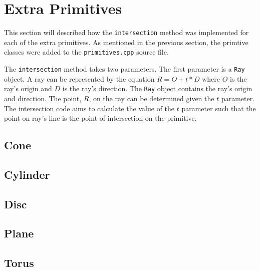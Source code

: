 \section{Extra Primitives}

This section will described how the \verb|intersection| method was
implemented for each of the extra primitives. As mentioned in the previous
section, the primtive classes were added to the \verb|primitives.cpp| source 
file.

The \verb|intersection| method takes two parameters. The first parameter is a
\verb|Ray| object. A ray can be represented by the equation $R = O + t*D$ where
$O$ is the ray's origin and $D$ is the ray's direction. The \verb|Ray| object
contains the ray's origin and direction. The point, $R$, on the ray can be 
determined given the $t$ parameter. The intersection code aims to calculate the
value of the $t$ parameter such that the point on ray's line is the point of
intersection on the primitive.

\subsection*{Cone}


\subsection*{Cylinder}

\subsection*{Disc}

\subsection*{Plane}

\subsection*{Torus}


